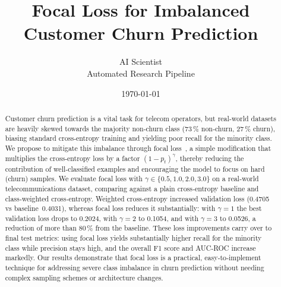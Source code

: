 \documentclass[11pt,a4paper]{article}
\begin{document}

\title{Focal Loss for Imbalanced Customer Churn Prediction}

\author{AI Scientist \\ Automated Research Pipeline}
\date{\today}
\maketitle


\begin{abstract}
Customer churn prediction is a vital task for telecom operators, but real‑world datasets are heavily skewed towards the majority non‑churn class (73\,\% non‑churn, 27\,\% churn), biasing standard cross‑entropy training and yielding poor recall for the minority class.
We propose to mitigate this imbalance through focal loss~\cite{lin2017focal}, a simple modification that multiplies the cross‑entropy loss by a factor $(1-p_t)^\gamma$, thereby reducing the contribution of well‑classified examples and encouraging the model to focus on hard (churn) samples.
We evaluate focal loss with $\gamma \in \{0.5,1.0,2.0,3.0\}$ on a real‑world telecommunications dataset, comparing against a plain cross‑entropy baseline and class‑weighted cross‑entropy.
Weighted cross‑entropy increased validation loss (0.4705 vs baseline~0.4031), whereas focal loss reduces it substantially: with $\gamma = 1$ the best validation loss drops to 0.2024, with $\gamma = 2$ to 0.1054, and with $\gamma = 3$ to 0.0526, a reduction of more than 80\,\% from the baseline.
These loss improvements carry over to final test metrics: using focal loss yields substantially higher recall for the minority class while precision stays high, and the overall F1 score and AUC‑ROC increase markedly.
Our results demonstrate that focal loss is a practical, easy‑to‑implement technique for addressing severe class imbalance in churn prediction without needing complex sampling schemes or architecture changes.
\end{abstract}
\end{document}
